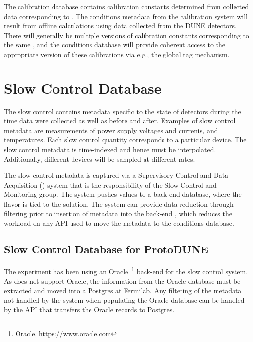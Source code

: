 \documentclass[../main-v1.tex]{subfiles}
\begin{document}
The calibration database contains calibration constants determined from collected data corresponding to  . The conditions metadata from the calibration system will result from offline calculations using data collected from the DUNE detectors.
There will generally be multiple versions of calibration constants corresponding to the same , and the conditions database will provide coherent access to the appropriate version of these calibrations via e.g., the global tag mechanism.

\section{Slow Control Database }
\label{sec:db:slowcontrol}  

The slow control  contains metadata specific to the state of detectors during the time data were collected as well as before and after. Examples of slow control metadata are measurements of power supply voltages and currents, and temperatures. Each slow control quantity corresponds to a particular device. The slow control  metadata is time-indexed and hence must be interpolated. Additionally, different devices will be sampled at different rates.

The slow control metadata is captured via a Supervisory Control and Data Acquisition () system that is the responsibility of the Slow Control and Monitoring group. The   system pushes values to a back-end database, where the  flavor is tied to the  solution. 
The   system can provide data reduction through filtering prior to insertion of metadata into the back-end , which reduces the workload on any API used to move the metadata to the conditions database. 

\subsection{Slow Control Database for ProtoDUNE}
\label{sec:slowcontrolPD}

The  experiment has been using an Oracle~\footnote{Oracle\textcopyright, \url{https://www.oracle.com}} back-end  for the slow control system. As 
does not support Oracle, the information from the Oracle database must be extracted and moved into a Postgres  at Fermilab. Any filtering of the metadata not handled by the   system when populating the Oracle database can be handled by the API that transfers the Oracle records to Postgres.
\end{document}
